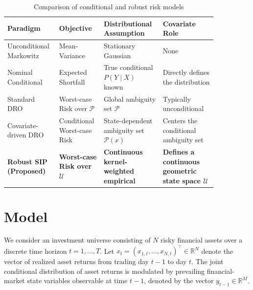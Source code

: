 \documentclass[smallextended]{svjour3}
\begin{document}
\begin{table}[htbp]
\centering
\caption{Comparison of conditional and robust risk models}
\label{tab:lit_comparison}
\begin{tabular}{>{\raggedright\arraybackslash}p{0.18\linewidth}>{\raggedright\arraybackslash}p{0.17\linewidth}>{\raggedright\arraybackslash}p{0.26\linewidth}>{\raggedright\arraybackslash}p{0.24\linewidth}}
\toprule
\textbf{Paradigm} & \textbf{Objective} & \textbf{Distributional Assumption} & \textbf{Covariate Role} \\
\midrule
Unconditional Markowitz & Mean-Variance & Stationary Gaussian & None \\
Nominal Conditional & Expected Shortfall & True conditional $P(Y \mid X)$ known & Directly defines the distribution \\
Standard DRO & Worst-case Risk over $\mathcal{P}$ & Global ambiguity set $\mathcal{P}$ & Typically unconditional \\
Covariate-driven DRO & Conditional Worst-case Risk & State-dependent ambiguity set $\mathcal{P}(x)$ & Centers the conditional ambiguity set \\
\textbf{Robust SIP (Proposed)} & \textbf{Worst-case Risk over $\mathcal{U}$} & \textbf{Continuous kernel-weighted empirical} & \textbf{Defines a continuous geometric state space $\mathcal{U}$} \\
\bottomrule
\end{tabular}
\end{table}




\section{Model}\label{sec:model}
We consider an investment universe consisting of $N$ risky financial assets over a discrete time horizon $t = 1, \dots, T$. Let $x_t = (x_{1,t}, \dots, x_{N,t})^\top \in \mathbb{R}^N$ denote the vector of realized asset returns from trading day $t-1$ to day $t$. The joint conditional distribution of asset returns is modulated by prevailing financial-market state variables observable at time $t-1$, denoted by the vector $y_{t-1} \in \mathbb{R}^M$.
\end{document}
